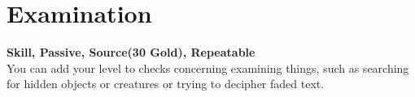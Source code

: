 \section{Examination}\label{sec:examination}
\textbf{Skill, Passive, Source(30 Gold), Repeatable}\\
You can add your level to checks concerning examining things, such as searching for hidden objects or creatures or trying to decipher faded text.